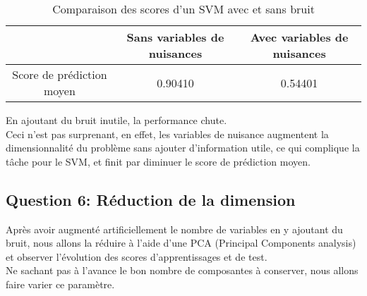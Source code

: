 \documentclass{article}
\begin{document}
\begin{table}[h]
    \centering
    \begin{tabular}{|c|c|c|}
       \hline  & Sans variables de nuisances & Avec variables de nuisances \\
       \hline Score de prédiction moyen  & 0.90410 & 0.54401\\
       \hline
    \end{tabular}
    \caption{Comparaison des scores d'un SVM avec et sans bruit}
    \label{tab:my_label}
\end{table}
 En ajoutant du bruit inutile, la performance chute.
 \\ Ceci n'est pas surprenant, en effet, les variables 
 de nuisance augmentent la dimensionnalité du problème sans ajouter d'information utile,
 ce qui complique la tâche pour le SVM, et finit par diminuer le score de prédiction moyen.

\newpage
 \subsection{Question 6: Réduction de la dimension}

Après avoir augmenté artificiellement le nombre de variables en y ajoutant du bruit, nous allons la réduire à l'aide d'une PCA (Principal Components analysis) et observer l'évolution des scores d'apprentissages et de test.
\\ Ne sachant pas à l'avance le bon nombre de composantes à conserver, nous allons faire varier ce paramètre.
\end{document}

